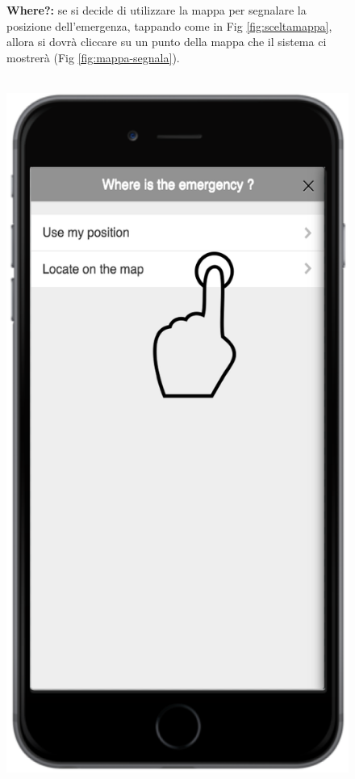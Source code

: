  \begin{figure}
\textbf{Where?:} se si decide di utilizzare la mappa per segnalare la posizione dell'emergenza, tappando come in Fig \ref{fig:sceltamappa}, allora si dovrà cliccare su un punto della mappa che il sistema ci mostrerà (Fig \ref{fig:mappa-segnala}).
 \\ \\
 \begin{minipage}[b]{6cm}
   \centering
\includegraphics[scale=0.6]{interfaccia/sceltamap.png}

\end{minipage}
\end{figure}
